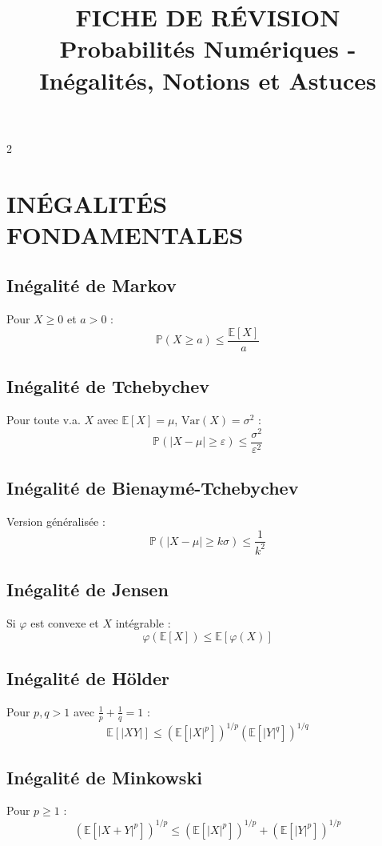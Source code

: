 \documentclass[10pt,a4paper]{article}
\title{\vspace{-2cm}\textbf{FICHE DE RÉVISION}\\
\large Probabilités Numériques - Inégalités, Notions et Astuces}
\author{}
\date{}
\begin{document}
\maketitle
\begin{multicols}{2}

\section*{INÉGALITÉS FONDAMENTALES}

\subsection*{Inégalité de Markov}
Pour $X \geq 0$ et $a > 0$ :
\[
\mathbb{P}(X \geq a) \leq \frac{\mathbb{E}[X]}{a}
\]

\subsection*{Inégalité de Tchebychev}
Pour toute v.a. $X$ avec $\mathbb{E}[X] = \mu$, $\text{Var}(X) = \sigma^2$ :
\[
\mathbb{P}(|X - \mu| \geq \varepsilon) \leq \frac{\sigma^2}{\varepsilon^2}
\]

\subsection*{Inégalité de Bienaymé-Tchebychev}
Version généralisée :
\[
\mathbb{P}(|X - \mu| \geq k\sigma) \leq \frac{1}{k^2}
\]

\subsection*{Inégalité de Jensen}
Si $\varphi$ est convexe et $X$ intégrable :
\[
\varphi(\mathbb{E}[X]) \leq \mathbb{E}[\varphi(X)]
\]

\subsection*{Inégalité de Hölder}
Pour $p, q > 1$ avec $\frac{1}{p} + \frac{1}{q} = 1$ :
\[
\mathbb{E}[|XY|] \leq (\mathbb{E}[|X|^p])^{1/p} (\mathbb{E}[|Y|^q])^{1/q}
\]

\subsection*{Inégalité de Minkowski}
Pour $p \geq 1$ :
\[
(\mathbb{E}[|X+Y|^p])^{1/p} \leq (\mathbb{E}[|X|^p])^{1/p} + (\mathbb{E}[|Y|^p])^{1/p}
\]


\end{multicols}
\end{document}
